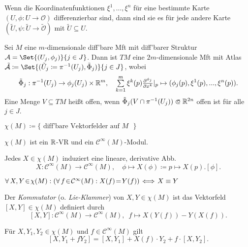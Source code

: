 \documentclass{cheat-sheet}
\renewcommand{\O}{\mathcal{O}} %
\newcommand{\A}{\mathcal{A}} %
\newcommand{\Cont}{\mathcal{C}} %
\begin{document}
\begin{lem}
  Wenn die Koordinatenfunktionen $\xi^1, \ldots, \xi^n$ für eine bestimmte Karte $(U, \phi : U \to \O)$ differenzierbar sind, dann sind sie es für jede andere Karte $(\tilde{U}, \psi : \tilde{U} \to \tilde{\O})$ mit $\tilde{U} \subseteq U$.
\end{lem}

\begin{defn}
  Sei $M$ eine $m$-dimensionale diff'bare Mft mit diff'barer Struktur $\A = \Set{(U_j, \phi_j)}{j \in J}$. Dann ist $TM$ eine $2m$-dimensionale Mft mit Atlas $\tilde{\A} \coloneqq \Set{(\tilde{U}_j \coloneqq \pi^{-1}(U_j), \tilde{\Phi}_j)}{j \in J}$, wobei
  \[
    \tilde{\Phi}_j : \pi^{-1}(U_j) \to \phi_j(U_j) \times \R^m, \quad
    \sum_{k=1}^m \xi^k(p) \tfrac{\partial^{\phi_j}}{\partial x^k}|_p \mapsto (\phi_j(p), \xi^1(p), \nldots, \xi^n(p)).
  \]
  Eine Menge $V \subseteq TM$ heißt offen, wenn $\tilde{\Phi}_j(V \cap \pi^{-1}(U_j)) \opn \R^{2n}$ offen ist für alle $j \in J$.
\end{defn}

\begin{nota}
  $\chi(M) \coloneqq \{\text{ diff'bare Vektorfelder auf $M$ }\}$
\end{nota}

\begin{bem}
  $\chi(M)$ ist ein $\mathbb{R}$-VR und ein $\Cont^\infty(M)$-Modul.
\end{bem}

\begin{lem}
  Jedes $X \in \chi(M)$ induziert eine lineare, derivative Abb.
  \[
    X : \Cont^\infty(M) \to \Cont^\infty(M), \quad
    \phi \mapsto X(\phi) \coloneqq p \mapsto X(p) . [\phi].
  \]
\end{lem}

\begin{lem}
  $\fa{X, Y \!\in\! \chi(M)\!}\! (\fa{f \!\in\! \Cont^\infty(M)\!}\! X(f) \!=\! Y(f)) \!\iff\! X \equiv Y$
\end{lem}

\begin{defn}
  Der \emph{Kommutator} (o. \emph{Lie-Klammer}) von $X, Y \in \chi(M)$ ist das Vektorfeld $[X, Y] \in \chi(M)$ definiert durch
  \[
    [X, Y] : \Cont^\infty(M) \to \Cont^\infty(M), \enspace
    f \mapsto X(Y(f)) - Y(X(f)).
  \]
\end{defn}

\begin{satz}
  Für $X, Y_1, Y_2 \in \chi(M)$ und $f \in \Cont^\infty(M)$ gilt
  \[ [X, Y_1 + f Y_2] = [X, Y_1] + X(f) \cdot Y_2 + f \cdot [X, Y_2]. \]
\end{satz}
\end{document}
